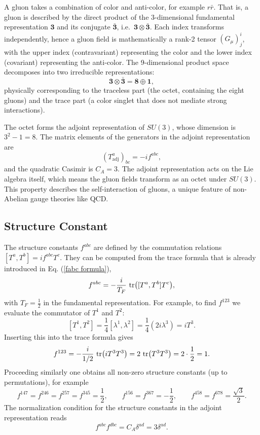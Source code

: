 \documentclass[12pt]{article}
\begin{document}
	A gluon takes a combination of color and anti-color, for example $r\bar{r}$. That is, a gluon is described by the direct product of the 3-dimensional fundamental representation $\mathbf{3}$ and its conjugate $\bar{\mathbf{3}}$, i.e.\ $\mathbf{3} \otimes \bar{\mathbf{3}}$. Each index transforms independently, hence a gluon field is mathematically a rank-2 tensor $(G_\mu)^i_j$, with the upper index (contravariant) representing the color and the lower index (covariant) representing the anti-color. The 9-dimensional product space decomposes into two irreducible representations:
	\begin{equation}
		\mathbf{3} \otimes \bar{\mathbf{3}} = \mathbf{8} \oplus \mathbf{1},
	\end{equation}
	physically corresponding to the traceless part (the octet, containing the eight gluons) and the trace part (a color singlet that does not mediate strong interactions).
	
	The octet forms the adjoint representation of $SU(3)$, whose dimension is $3^2-1 = 8$. The matrix elements of the generators in the adjoint representation are
	\begin{equation}
		(T^a_{\text{adj}})_{bc} = -if^{abc},
	\end{equation}
	and the quadratic Casimir is $C_A = 3$. The adjoint representation acts on the Lie algebra itself, which means the gluon fields transform as an octet under $SU(3)$. This property describes the self-interaction of gluons, a unique feature of non-Abelian gauge theories like QCD.
	
	\subsection{Structure Constant}
	The structure constants $f^{abc}$ are defined by the commutation relations $[T^a, T^b] = i f^{abc} T^c$. They can be computed from the trace formula that is already introduced in Eq. (\ref{fabc formula}),
	\begin{equation}
		f^{abc} = -\frac{i}{T_F}\,\tr\!\big([T^a, T^b] T^c\big),
	\end{equation}
	with $T_F = \frac12$ in the fundamental representation. For example, to find $f^{123}$ we evaluate the commutator of $T^1$ and $T^2$:
	\[
	[T^1, T^2] = \frac{1}{4}[\lambda^1, \lambda^2] = \frac{1}{4}(2i\lambda^3) = i T^3.
	\]
	Inserting this into the trace formula gives
	\[
	f^{123} = -\frac{i}{1/2}\,\tr\!\big(i T^3 T^3\big) = 2\,\tr(T^3 T^3) = 2\cdot\frac12 = 1.
	\]
	Proceeding similarly one obtains all non-zero structure constants (up to permutations), for example
	\[
	f^{147} = f^{246} = f^{257} = f^{345} = \frac12,\qquad
	f^{156} = f^{367} = -\frac12,\qquad
	f^{458} = f^{678} = \frac{\sqrt{3}}{2}.
	\]
	The normalization condition for the structure constants in the adjoint representation reads
	\begin{equation}
		f^{abc}f^{dbc} = C_A \delta^{ad} = 3\delta^{ad}.
	\end{equation}
	
\end{document}
